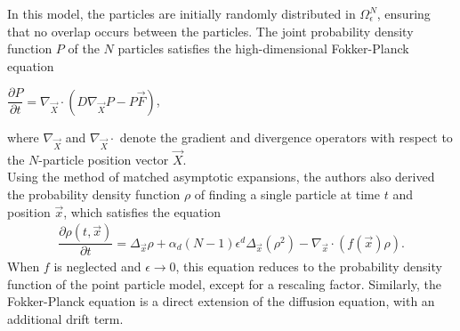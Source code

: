 In this model, the particles are initially randomly distributed in $\Omega^N_{\epsilon}$, ensuring that no overlap occurs between the particles.
The joint probability density function $P$ of the $N$ particles satisfies the high-dimensional Fokker-Planck equation
\begin{center}
	$\dfrac{\partial P}{\partial t} = \nabla_{\vec{X}} \cdot (D \nabla_{\vec{X}} P - P \vec{F})$,
\end{center}
where $\nabla_{\vec{X}}$ and $\nabla_{\vec{X}} \cdot$ denote the gradient and divergence operators with respect to the $N$-particle position vector $\vec{X}$.\\
Using the method of matched asymptotic expansions, the authors also derived the probability density function $\rho$ of finding a single particle at time $t$ and position $\vec{x}$, which satisfies the equation
\begin{align}
	\dfrac{\partial \rho (t, \vec{x})}{\partial t} = \Delta_{\vec{x}} \rho + \alpha_d (N - 1) \epsilon^d \Delta_{\vec{x}} (\rho^2) - \nabla_{\vec{x}} \cdot (f(\vec{x}) \rho).
\end{align}
When $f$ is neglected and $\epsilon \rightarrow 0$, this equation reduces to the probability density function of the point particle model, except for a rescaling factor.
Similarly, the Fokker-Planck equation is a direct extension of the diffusion equation, with an additional drift term.\\



